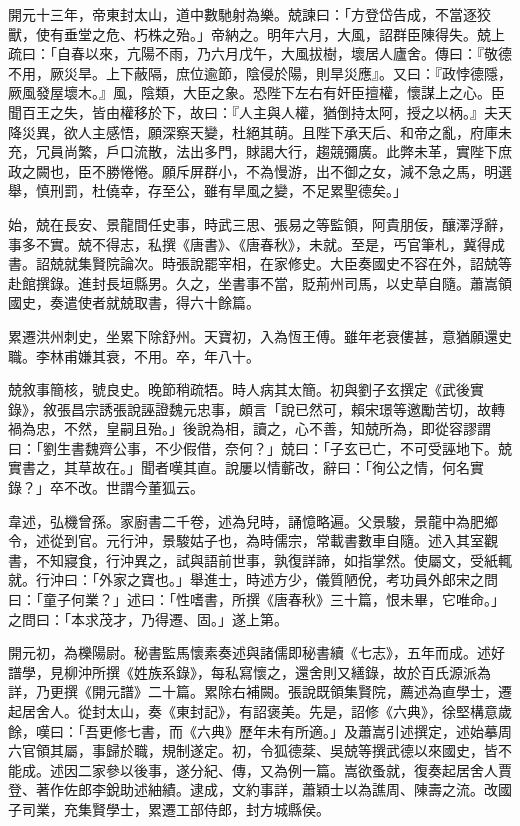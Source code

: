 \begin{pinyinscope}
 開元十三年，帝東封太山，道中數馳射為樂。兢諫曰：「方登岱告成，不當逐狡獸，使有垂堂之危、朽株之殆。」帝納之。明年六月，大風，詔群臣陳得失。兢上疏曰：「自春以來，亢陽不雨，乃六月戊午，大風拔樹，壞居人廬舍。傳曰：『敬德不用，厥災旱。上下蔽隔，庶位逾節，陰侵於陽，則旱災應』。又曰：『政悖德隱，厥風發屋壞木。』風，陰類，大臣之象。恐陛下左右有奸臣擅權，懷謀上之心。臣聞百王之失，皆由權移於下，故曰：『人主與人權，猶倒持太阿，授之以柄。』夫天降災異，欲人主感悟，願深察天變，杜絕其萌。且陛下承天后、和帝之亂，府庫未充，冗員尚繁，戶口流散，法出多門，賕謁大行，趨競彌廣。此弊未革，實陛下庶政之闕也，臣不勝惓惓。願斥屏群小，不為慢游，出不御之女，減不急之馬，明選舉，慎刑罰，杜僥幸，存至公，雖有旱風之變，不足累聖德矣。」



 始，兢在長安、景龍間任史事，時武三思、張易之等監領，阿貴朋佞，釀澤浮辭，事多不實。兢不得志，私撰《唐書》、《唐春秋》，未就。至是，丐官筆札，冀得成書。詔兢就集賢院論次。時張說罷宰相，在家修史。大臣奏國史不容在外，詔兢等赴館撰錄。進封長垣縣男。久之，坐書事不當，貶荊州司馬，以史草自隨。蕭嵩領國史，奏遣使者就兢取書，得六十餘篇。



 累遷洪州刺史，坐累下除舒州。天寶初，入為恆王傅。雖年老衰僂甚，意猶願還史職。李林甫嫌其衰，不用。卒，年八十。



 兢敘事簡核，號良史。晚節稍疏牾。時人病其太簡。初與劉子玄撰定《武後實錄》，敘張昌宗誘張說誣證魏元忠事，頗言「說已然可，賴宋璟等邀勵苦切，故轉禍為忠，不然，皇嗣且殆。」後說為相，讀之，心不善，知兢所為，即從容謬謂曰：「劉生書魏齊公事，不少假借，奈何？」兢曰：「子玄已亡，不可受誣地下。兢實書之，其草故在。」聞者嘆其直。說屢以情蘄改，辭曰：「徇公之情，何名實錄？」卒不改。世謂今董狐云。



 韋述，弘機曾孫。家廚書二千卷，述為兒時，誦憶略遍。父景駿，景龍中為肥鄉令，述從到官。元行沖，景駿姑子也，為時儒宗，常載書數車自隨。述入其室觀書，不知寢食，行沖異之，試與語前世事，孰復詳諦，如指掌然。使屬文，受紙輒就。行沖曰：「外家之寶也。」舉進士，時述方少，儀質陋侻，考功員外郎宋之問曰：「童子何業？」述曰：「性嗜書，所撰《唐春秋》三十篇，恨未畢，它唯命。」之問曰：「本求茂才，乃得遷、固。」遂上第。



 開元初，為櫟陽尉。秘書監馬懷素奏述與諸儒即秘書續《七志》，五年而成。述好譜學，見柳沖所撰《姓族系錄》，每私寫懷之，還舍則又繕錄，故於百氏源派為詳，乃更撰《開元譜》二十篇。累除右補闕。張說既領集賢院，薦述為直學士，遷起居舍人。從封太山，奏《東封記》，有詔褒美。先是，詔修《六典》，徐堅構意歲餘，嘆曰：「吾更修七書，而《六典》歷年未有所適。」及蕭嵩引述撰定，述始摹周六官領其屬，事歸於職，規制遂定。初，令狐德棻、吳兢等撰武德以來國史，皆不能成。述因二家參以後事，遂分紀、傳，又為例一篇。嵩欲蚤就，復奏起居舍人賈登、著作佐郎李銳助述紬績。逮成，文約事詳，蕭穎士以為譙周、陳壽之流。改國子司業，充集賢學士，累遷工部侍郎，封方城縣侯。




\end{pinyinscope}
